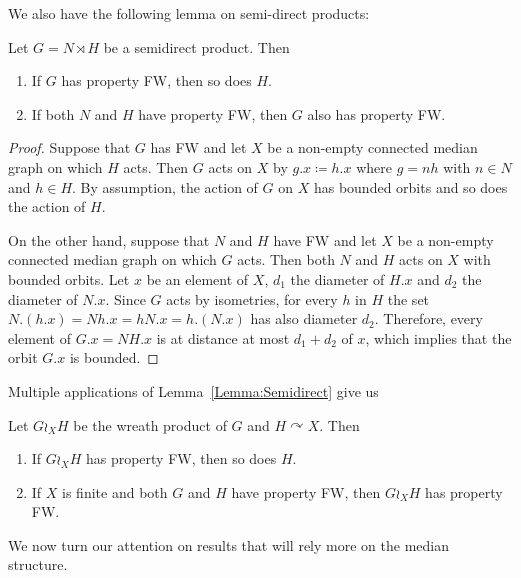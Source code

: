 We also have the following lemma on semi-direct products:
\begin{lem}\label{Lemma:Semidirectb}
Let $G=N\rtimes H$ be a semidirect product. Then
\begin{enumerate}
\item
If $G$ has property FW, then so does $H$.
\item
If both $N$ and $H$ have property FW, then $G$ also has property FW.
\end{enumerate}
\end{lem}
\begin{proof}
Suppose that $G$ has FW and let $X$ be a non-empty connected median graph on which $H$ acts.
Then $G$ acts on $X$ by $g.x\coloneqq h.x$ where $g=nh$ with $n\in N$ and $h\in H$.
By assumption, the action of $G$ on $X$ has bounded orbits and so does the action of $H$.

On the other hand, suppose that $N$ and $H$ have FW and let $X$ be a non-empty connected median graph on which $G$ acts.
Then both $N$ and $H$ acts on $X$ with bounded orbits.
Let $x$ be an element of $X$, $d_1$ the diameter of $H.x$ and $d_2$ the diameter of $N.x$.
Since $G$ acts by isometries, for every $h$ in $H$ the set $N.(h.x)=Nh.x=hN.x=h.(N.x)$ has also diameter $d_2$.
Therefore, every element of $G.x=NH.x$ is at distance at most $d_1+d_2$ of $x$, which implies that the orbit $G.x$ is bounded. %
\end{proof}
Multiple applications of Lemma~\ref{Lemma:Semidirect} give us
\begin{cor}\label{Cor:Wreathb}
Let $G\wr_X H$ be the wreath product of $G$ and $H\curvearrowright X$.
Then
\begin{enumerate}
\item
If $G\wr_X H$ has property FW, then so does $H$.
\item
If $X$ is finite and both $G$ and $H$ have property FW, then $G\wr_X H$ has property FW.
\end{enumerate}
\end{cor}







We now turn our attention on results that will rely more on the median structure.

